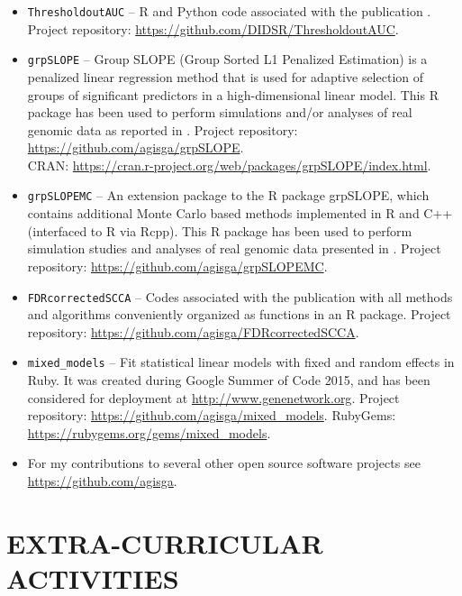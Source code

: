 \documentclass[overlapped, line, 10pt]{res} %
\begin{document}
\begin{resume}
\begin{itemize}
  \item \verb!ThresholdoutAUC! -- R and Python code associated with the publication \cite{Gossmann2021-bp}. Project repository: \url{https://github.com/DIDSR/ThresholdoutAUC}.
  \item \verb!grpSLOPE! -- Group SLOPE (Group Sorted L1 Penalized Estimation) is a penalized linear regression method that is used for adaptive selection of groups of significant predictors in a high-dimensional linear model. This R package has been used to perform simulations and/or analyses of real genomic data as reported in \cite{Gossmann2017-yu, brzyski2016}. Project repository: \url{https://github.com/agisga/grpSLOPE}.\\
    CRAN: \url{https://cran.r-project.org/web/packages/grpSLOPE/index.html}.
  \item \verb!grpSLOPEMC! -- An extension package to the R package grpSLOPE, which contains additional Monte Carlo based methods implemented in R and C++ (interfaced to R via Rcpp). This R package has been used to perform simulation studies and analyses of real genomic data presented in \cite{Gossmann2017-yu}. Project repository: \url{https://github.com/agisga/grpSLOPEMC}.
  \item \verb!FDRcorrectedSCCA! -- Codes associated with the publication \cite{Gossmann2017-ln} with all methods and algorithms conveniently organized as functions in an R package. Project repository: \url{https://github.com/agisga/FDRcorrectedSCCA}.
  \item \verb!mixed_models! -- Fit statistical linear models with fixed and random effects in Ruby. It was created during Google Summer of Code 2015, and has been considered for deployment at \url{http://www.genenetwork.org}. Project repository: \url{https://github.com/agisga/mixed_models}. RubyGems: \url{https://rubygems.org/gems/mixed_models}.
  \item For my contributions to several other open source software projects see \url{https://github.com/agisga}.
\end{itemize}


\section{EXTRA-CURRICULAR ACTIVITIES}


\end{resume}
\end{document}
